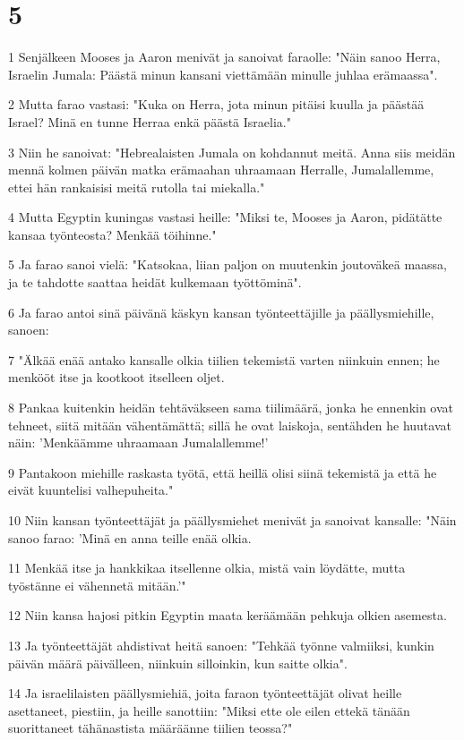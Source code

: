 \chapter{5}

\par 1 Senjälkeen Mooses ja Aaron menivät ja sanoivat faraolle: "Näin sanoo Herra, Israelin Jumala: Päästä minun kansani viettämään minulle juhlaa erämaassa".
\par 2 Mutta farao vastasi: "Kuka on Herra, jota minun pitäisi kuulla ja päästää Israel? Minä en tunne Herraa enkä päästä Israelia."
\par 3 Niin he sanoivat: "Hebrealaisten Jumala on kohdannut meitä. Anna siis meidän mennä kolmen päivän matka erämaahan uhraamaan Herralle, Jumalallemme, ettei hän rankaisisi meitä rutolla tai miekalla."
\par 4 Mutta Egyptin kuningas vastasi heille: "Miksi te, Mooses ja Aaron, pidätätte kansaa työnteosta? Menkää töihinne."
\par 5 Ja farao sanoi vielä: "Katsokaa, liian paljon on muutenkin joutoväkeä maassa, ja te tahdotte saattaa heidät kulkemaan työttöminä".
\par 6 Ja farao antoi sinä päivänä käskyn kansan työnteettäjille ja päällysmiehille, sanoen:
\par 7 "Älkää enää antako kansalle olkia tiilien tekemistä varten niinkuin ennen; he menkööt itse ja kootkoot itselleen oljet.
\par 8 Pankaa kuitenkin heidän tehtäväkseen sama tiilimäärä, jonka he ennenkin ovat tehneet, siitä mitään vähentämättä; sillä he ovat laiskoja, sentähden he huutavat näin: 'Menkäämme uhraamaan Jumalallemme!'
\par 9 Pantakoon miehille raskasta työtä, että heillä olisi siinä tekemistä ja että he eivät kuuntelisi valhepuheita."
\par 10 Niin kansan työnteettäjät ja päällysmiehet menivät ja sanoivat kansalle: "Näin sanoo farao: 'Minä en anna teille enää olkia.
\par 11 Menkää itse ja hankkikaa itsellenne olkia, mistä vain löydätte, mutta työstänne ei vähennetä mitään.'"
\par 12 Niin kansa hajosi pitkin Egyptin maata keräämään pehkuja olkien asemesta.
\par 13 Ja työnteettäjät ahdistivat heitä sanoen: "Tehkää työnne valmiiksi, kunkin päivän määrä päivälleen, niinkuin silloinkin, kun saitte olkia".
\par 14 Ja israelilaisten päällysmiehiä, joita faraon työnteettäjät olivat heille asettaneet, piestiin, ja heille sanottiin: "Miksi ette ole eilen ettekä tänään suorittaneet tähänastista määräänne tiilien teossa?"
